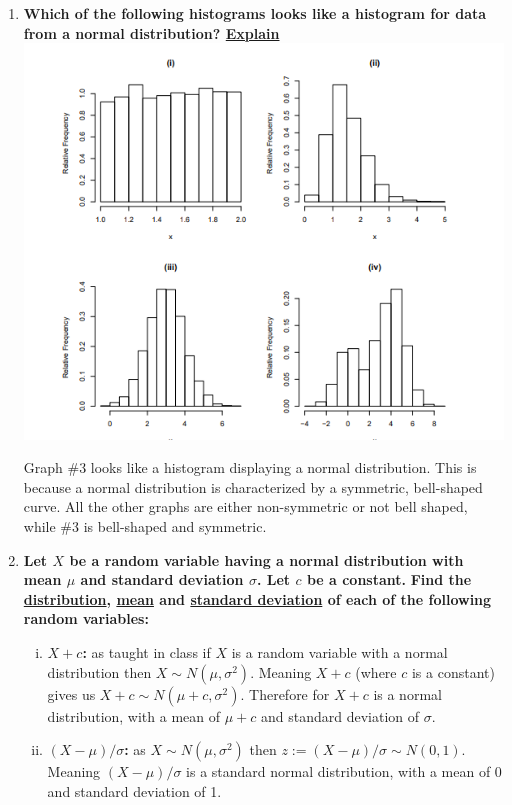 \documentclass{article}
\begin{document}
\begin{enumerate}[1.]
\item
\textbf{Which of the following histograms looks like a histogram for data from a normal distribution? \underline{Explain}}
\includegraphics{graphs}

Graph \#3 looks like a histogram displaying a normal distribution. This is because a normal distribution is characterized by a symmetric, bell-shaped curve. All the other graphs are either non-symmetric or not bell shaped, while \#3 is bell-shaped and symmetric.

\item
\textbf{Let $X$ be a random variable having a normal distribution with mean $\mu$ and standard deviation $\sigma$. Let $c$ be a constant.}
\textbf{Find the \underline{distribution}, \underline{mean} and \underline{standard deviation} of each of the following random variables:}
\begin{enumerate}[(i)]
  \item \textbf{$X + c$: } as taught in class if $X$ is a random variable with a normal distribution then $X \sim N(\mu, \sigma^2)$. Meaning $X + c$ (where $c$ is a constant) gives us $X + c \sim N(\mu + c, \sigma^2)$. Therefore for $X + c$ is a normal distribution, with a mean of $\mu + c$ and standard deviation of $\sigma$. 
  \item \textbf{$(X - \mu)/\sigma$: } as $X \sim N(\mu, \sigma^2)$ then $z := (X - \mu)/\sigma \sim N(0, 1)$. Meaning $(X - \mu)/\sigma$ is a standard normal distribution, with a mean of 0 and standard deviation of 1.
\end{enumerate}


\end{enumerate}
\end{document}
